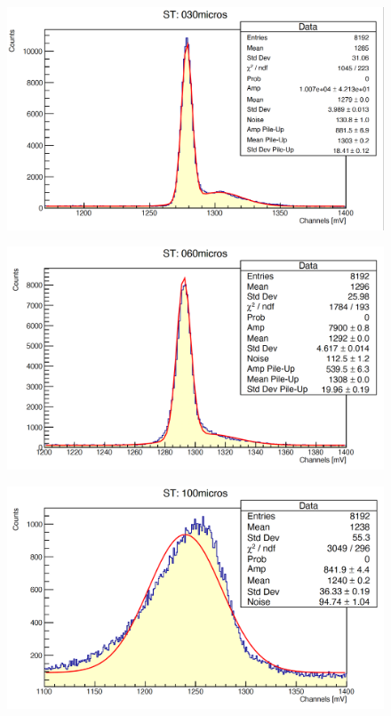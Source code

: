 \documentclass[a4paper,10pt]{article}
\begin{document}
\begin{figure}[H]
    \centering
    \includegraphics[scale=0.45]{appendice/30}
\end{figure}
\begin{figure}[H]
    \centering
    \includegraphics[scale=0.45]{appendice/60}
\end{figure}
\begin{figure}[H]
    \centering
    \includegraphics[scale=0.45]{appendice/100}
\end{figure}
\end{document}
